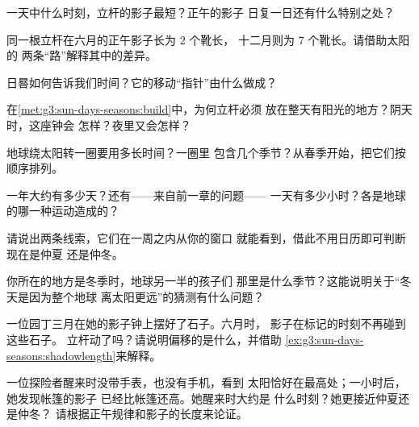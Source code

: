 \begin{exercise}[$\star$]\label{exo:g3:sun-days-seasons:2}
一天中什么时刻，立杆的影子最短？正午的影子
日复一日还有什么特别之处？
\end{exercise}

\begin{exercise}[$\star$]\label{exo:g3:sun-days-seasons:3}
同一根立杆在六月的正午影子长为 $2$ 个靴长，
十二月则为 $7$ 个靴长。请借助太阳的
两条“路”解释其中的差异。
\end{exercise}

\begin{exercise}[$\star$]\label{exo:g3:sun-days-seasons:4}
日晷如何告诉我们时间？它的移动“指针”由什么做成？
\end{exercise}

\begin{exercise}[$\star$]\label{exo:g3:sun-days-seasons:5}
在\cref{met:g3:sun-days-seasons:build}中，为何立杆必须
放在整天有阳光的地方？阴天时，这座钟会
怎样？夜里又会怎样？
\end{exercise}

\begin{exercise}[$\star$]\label{exo:g3:sun-days-seasons:6}
地球绕太阳转一圈要用多长时间？一圈里
包含几个季节？从春季开始，把它们按顺序排列。
\end{exercise}

\begin{exercise}[$\star$]\label{exo:g3:sun-days-seasons:7}
一年大约有多少天？还有——来自前一章的问题——
一天有多少小时？各是地球的哪一种运动造成的？
\end{exercise}

\begin{exercise}[$\star$]\label{exo:g3:sun-days-seasons:8}
请说出两条线索，它们在一周之内从你的窗口
就能看到，借此不用日历即可判断现在是仲夏
还是仲冬。
\end{exercise}

\begin{exercise}[$\star$]\label{exo:g3:sun-days-seasons:9}
你所在的地方是冬季时，地球另一半的孩子们
那里是什么季节？这能说明关于“冬天是因为整个地球
离太阳更远”的猜测有什么问题？
\end{exercise}

\begin{exercise}[$\star\star$]\label{exo:g3:sun-days-seasons:10}
一位园丁三月在她的影子钟上摆好了石子。六月时，
影子在标记的时刻不再碰到这些石子。
立杆动了吗？请说明偏移的是什么，并借助
\cref{ex:g3:sun-days-seasons:shadowlength}来解释。
\end{exercise}

\begin{exercise}[$\star\star$]\label{exo:g3:sun-days-seasons:11}
一位探险者醒来时没带手表，也没有手机，看到
太阳恰好在最高处；一小时后，她发现帐篷的影子
已经比帐篷还高。她醒来时大约是
什么时刻？她更接近仲夏还是仲冬？
请根据正午规律和影子的长度来论证。
\end{exercise}
